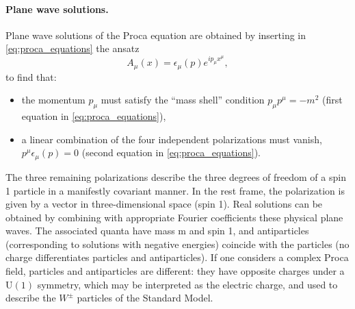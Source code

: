 \paragraph{Plane wave solutions.}
Plane wave solutions of the Proca equation are obtained by inserting in \eqref{eq:proca_equations} the ansatz
\[
    A_{\mu}(x) = \epsilon_{\mu}(p) e^{i p_\mu x^{\mu}},
\]
to find that:
\begin{itemize}
    \item the momentum \(p_\mu\) must satisfy the “mass shell” condition \(p_\mu p^{\mu} = -m^2\) (first equation in \eqref{eq:proca_equations}),
    \item a linear combination of the four independent polarizations must vanish, \(p^\mu \epsilon_{\mu}(p) = 0\) (second equation in \eqref{eq:proca_equations}).
\end{itemize}
The three remaining polarizations describe the three degrees of freedom of a spin 1 particle in a manifestly covariant manner. In the rest frame, the polarization is given by a vector in three-dimensional space (spin 1). Real solutions can be obtained by combining with appropriate Fourier coefficients these physical plane waves. The associated quanta have mass m and spin 1, and antiparticles (corresponding to solutions with negative energies) coincide with the particles (no charge differentiates particles and antiparticles). If one considers a complex Proca field, particles and antiparticles are different: they have opposite charges under a \(\mathrm{U}(1)\)  symmetry, which may be interpreted as the electric charge, and used to describe the \(W^{\pm}\) particles of the Standard Model.

